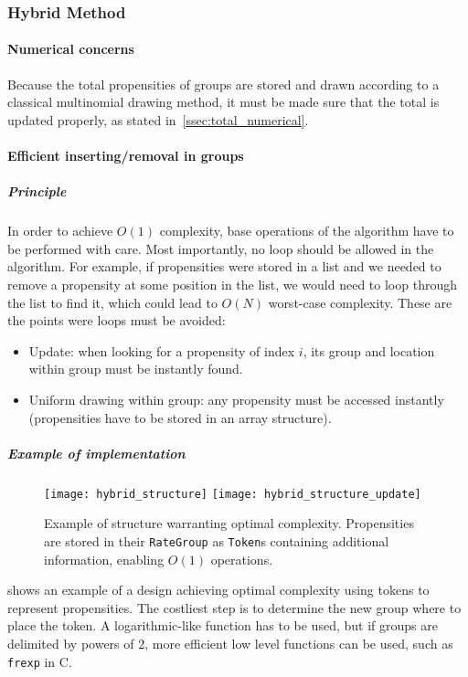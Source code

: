 \subsubsection{Hybrid Method}

\paragraph{Numerical concerns}

Because the total propensities of groups are stored and drawn according to a classical multinomial drawing method, it must be made sure that the total is updated properly, as stated in~\ref{ssec:total_numerical}.

\paragraph{Efficient inserting/removal in groups}

\subparagraph{Principle}

In order to achieve $O(1)$ complexity, base operations of the algorithm have to be performed with care. Most importantly, no loop should be allowed in the algorithm. For example, if propensities were stored in a list and we needed to remove a propensity at some position in the list, we would need to loop through the list to find it, which could lead to $O(N)$ worst-case complexity. These are the points were loops must be avoided:
\begin{itemize}
  \item Update: when looking for a propensity of index $i$, its group and location within group must be instantly found.
  \item Uniform drawing within group: any propensity must be accessed instantly (propensities have to be stored in an array structure).
\end{itemize}

\subparagraph{Example of implementation}
\begin{figure}[!h]
  \centering
  \texttt{[image: hybrid\_structure]}
  \texttt{[image: hybrid\_structure\_update]}
  \caption{Example of structure warranting optimal complexity. Propensities are stored in their \texttt{RateGroup} as \texttt{Token}s containing additional information, enabling $O(1)$ operations.}
  \label{fig:hybrid_structure}
\end {figure}

 shows an example of a design achieving optimal complexity using tokens to represent propensities. The costliest step is to determine the new group where to place the token. A logarithmic-like function has to be used, but if groups are delimited by powers of 2, more efficient low level functions can be used, such as \texttt{frexp} in C.

